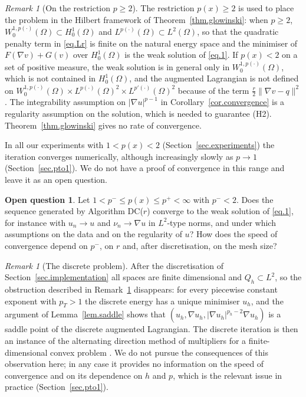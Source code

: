 \documentclass[11pt]{amsart}
\newcommand{\pp}{p(\cdot)}
\theoremstyle{definition}
\newtheorem{question}[teo]{Open question}
\theoremstyle{remark}
\newtheorem{remark}[teo]{Remark}
\numberwithin{equation}{section}
\begin{document}
\begin{remark}[On the restriction $p\ge2$]\label{rem.p2}
The restriction $p(x)\ge2$ is used to place the problem in the Hilbert framework of Theorem~\ref{thm.glowinski}: when $p\ge2$, $W^{1,\pp}_0(\Omega)\subset H^1_0(\Omega)$ and $L^{\pp}(\Omega)\subset L^2(\Omega)$, so that the quadratic penalty term in \eqref{eq.Lr} is finite on the natural energy space and the minimiser of $F(\nabla v)+G(v)$ over $H^1_0(\Omega)$ is the weak solution of \eqref{eq.1}. If $p(x)<2$ on a set of positive measure, the weak solution is in general only in $W^{1,\pp}_0(\Omega)$, which is not contained in $H^1_0(\Omega)$, and the augmented Lagrangian is not defined on $W^{1,\pp}_0(\Omega)\times L^{\pp}(\Omega)^2\times L^{p'(\cdot)}(\Omega)^2$ because of the term $\frac r2\|\nabla v-q\|^2$. The integrability assumption on $|\nabla u|^{p-1}$ in Corollary~\ref{cor.convergence} is a regularity assumption on the solution, which is needed to guarantee (H2). Theorem~\ref{thm.glowinski} gives no rate of convergence.
\end{remark}

In all our experiments with $1<p(x)<2$ (Section~\ref{sec.experiments}) the iteration converges numerically, although increasingly slowly as $p\to1$ (Section~\ref{sec.pto1}). We do not have a proof of convergence in this range and leave it as an open question.

\begin{question}\label{q.p<2}
Let $1<p^-\le p(x)\le p^+<\infty$ with $p^-<2$. Does the sequence generated by Algorithm DC($r$) converge to the weak solution of \eqref{eq.1}, for instance with $u_n\to u$ and $\nu_n\to\nabla u$ in $L^2$-type norms, and under which assumptions on the data and on the regularity of $u$? How does the speed of convergence depend on $p^-$, on $r$ and, after discretisation, on the mesh size?
\end{question}

\begin{remark}[The discrete problem]\label{rem.discrete}
After the discretisation of Section~\ref{sec.implementation} all spaces are finite dimensional and $Q_h\subset L^2$, so the obstruction described in Remark~\ref{rem.p2} disappears: for every piecewise constant exponent with $p_T>1$ the discrete energy has a unique minimiser $u_h$, and the argument of Lemma~\ref{lem.saddle} shows that $(u_h,\nabla u_h,|\nabla u_h|^{p_h-2}\nabla u_h)$ is a saddle point of the discrete augmented Lagrangian. The discrete iteration is then an instance of the alternating direction method of multipliers for a finite-dimensional convex problem \cite{GaM, FG, Boyd}. We do not pursue the consequences of this observation here; in any case it provides no information on the speed of convergence and on its dependence on $h$ and $p$, which is the relevant issue in practice (Section~\ref{sec.pto1}).
\end{remark}
\end{document}
